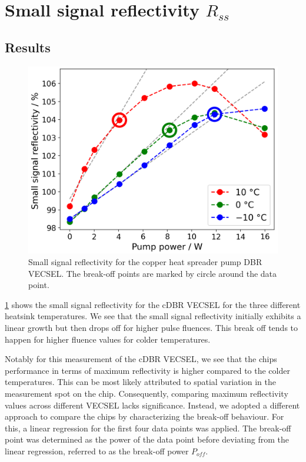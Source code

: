 \section{\texorpdfstring{Small signal reflectivity $R_{ss}$}{Small signal reflectivity Rss}}
\subsection*{Results}

\begin{figure}
    \vspace{-\baselineskip}
    \centering
    \includegraphics[width=.98\textwidth]{images/param1.png}
    \caption{Small signal reflectivity for the copper heat spreader pump DBR VECSEL. The break-off points are marked by circle around the data point.}
    \label{fig:rss}
\end{figure}

\cref{fig:rss} shows the small signal reflectivity for the cDBR VECSEL for the three different heatsink temperatures.
We see that the small signal reflectivity initially exhibits a linear growth but then drops off for higher pulse fluences. This break off tends to happen for higher fluence values for colder temperatures.

Notably for this measurement of the cDBR VECSEL, we see that the chips performance in terms of maximum reflectivity is higher compared to the colder temperatures. This can be most likely attributed to spatial variation in the measurement spot on the chip. Consequently, comparing maximum reflectivity values across different VECSEL lacks significance. Instead, we adopted a different approach to compare the chips by characterizing the break-off behaviour. For this, a linear regression for the first four data points was applied. The break-off point was determined as the power of the data point before deviating from the linear regression, referred to as the break-off power $P_{off}$.


